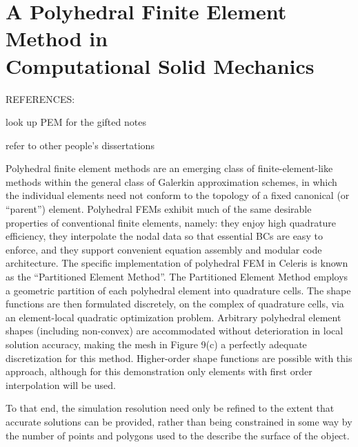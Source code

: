 \section[A Polyhedral Finite Element Method in Computational Solid \\ Mechanics]{\texorpdfstring{A Polyhedral Finite Element Method in \\ Computational Solid Mechanics}{A Polyhedral Finite Element Method in Computational Solid \\ Mechanics}}
\label{A Polyhedral Finite Element Method in Computational Solid Mechanics}

REFERENCES:
\cite{sukumar_2006}
\cite{rashid_2006, rashid_2012, rashid_2015}

look up PEM for the gifted notes

refer to other people's dissertations

Polyhedral finite element methods are an emerging class of finite-element-like methods within the general class of Galerkin approximation schemes, in which the individual elements need not conform to the topology of a fixed canonical (or “parent”) element. Polyhedral FEMs exhibit much of the same desirable properties of conventional finite elements, namely: they enjoy high quadrature efficiency, they interpolate the nodal data so that essential BCs are easy to enforce, and they support convenient equation assembly and modular code architecture. The specific implementation of polyhedral FEM in Celeris is known as the “Partitioned Element Method”. The Partitioned Element Method employs a geometric partition of each polyhedral element into quadrature cells. The shape functions are then formulated discretely, on the complex of quadrature cells, via an element-local quadratic optimization problem. Arbitrary polyhedral element shapes (including non-convex) are accommodated without deterioration in local solution accuracy, making the mesh in Figure 9(c) a perfectly adequate discretization for this method. Higher-order shape functions are possible with this approach, although for this demonstration only elements with first order interpolation will be used.

To that end, the simulation resolution need only be refined to the extent that accurate solutions can be provided, rather than being constrained in some way by the number of points and polygons used to the describe the surface of the object.

